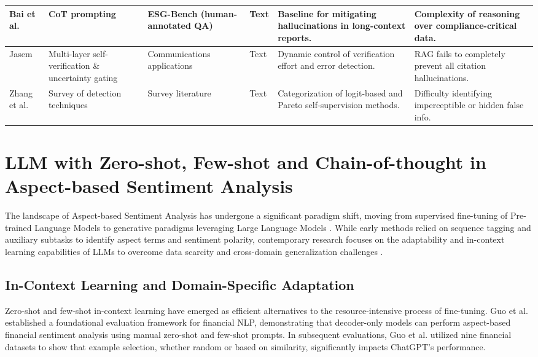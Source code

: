 \documentclass[english, online, cse, master]{dithesis}
\begin{document}
\begin{landscape}
\begin{table}[p]
\begin{tabularx}{\linewidth}{|p{1.8cm}|X|X|p{1.8cm}|X|X|}
Bai et al.  \parencite{association_for_artificial_intelligence_2026_86e12eae} & CoT prompting & ESG-Bench (human-annotated QA) & Text & Baseline for mitigating hallucinations in long-context reports. & Complexity of reasoning over compliance-critical data. \\ \hline
Jasem  \parencite{al_noor_ali_aziz_jasem_af362154} & Multi-layer self-verification \& uncertainty gating & Communications applications & Text & Dynamic control of verification effort and error detection. & RAG fails to completely prevent all citation hallucinations. \\ \hline
Zhang et al.  \parencite{yue_zhang_9101e661} & Survey of detection techniques & Survey literature & Text & Categorization of logit-based and Pareto self-supervision methods. & Difficulty identifying imperceptible or hidden false info. \\ \hline
\end{tabularx}
\end{table}
\end{landscape}


\section{LLM with Zero-shot, Few-shot and Chain-of-thought in Aspect-based Sentiment Analysis}

The landscape of Aspect-based Sentiment Analysis has undergone a significant paradigm shift, moving from supervised fine-tuning of Pre-trained Language Models to generative paradigms leveraging Large Language Models  \parencite[]{chengyan_wu_4c659eab, zhiyuan_ma_3b2e6db4}. While early methods relied on sequence tagging and auxiliary subtasks to identify aspect terms and sentiment polarity, contemporary research focuses on the adaptability and in-context learning capabilities of LLMs to overcome data scarcity and cross-domain generalization challenges  \parencite[]{nils_constantin_hellwig_6fa4e097, jakob_fehle_a0e62c9d}.
\subsection{In-Context Learning and Domain-Specific Adaptation}

Zero-shot and few-shot in-context learning have emerged as efficient alternatives to the resource-intensive process of fine-tuning. Guo et al.  \parencite{yue_guo_642efc19} established a foundational evaluation framework for financial NLP, demonstrating that decoder-only models can perform aspect-based financial sentiment analysis using manual zero-shot and few-shot prompts. In subsequent evaluations, Guo et al.  \parencite{yue_guo_642efc19} utilized nine financial datasets to show that example selection, whether random or based on similarity, significantly impacts ChatGPT's performance.
\end{document}
